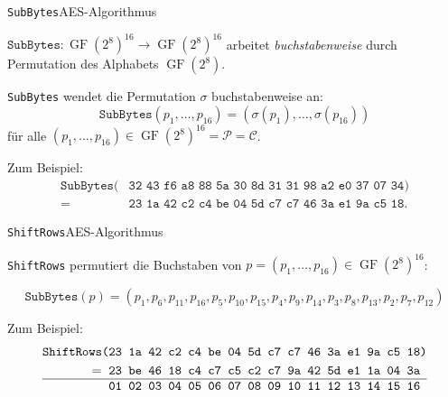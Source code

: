 \documentclass{beamer}
\newcommand{\mc}{\mathcal}
\newcommand{\GF}{\operatorname{GF}}
\theoremstyle{plain}
\begin{document}
\begin{frame}{\texttt{SubBytes}}{AES-Algorithmus}
\begin{block}{}$\texttt{SubBytes}: \GF(2^8)^{16} \rightarrow \GF(2^8)^{16}$ arbeitet \emph{buchstabenweise} durch Permutation des Alphabets $\GF(2^8)$.\end{block}\medskip

\texttt{SubBytes} wendet die Permutation $\sigma$ buchstabenweise an:
\[\texttt{SubBytes}(p_1, \dots, p_{16}) = (\sigma(p_1), \dotsc, \sigma(p_{16}))\]
für alle $(p_1, \dots, p_{16}) \in \GF(2^8)^{16} = \mc P = \mc C$.
\bigskip

Zum Beispiel:
\begin{align*}
\texttt{SubBytes(}&\texttt{32 43 f6 a8 88 5a 30 8d 31 31 98 a2 e0 37 07 34)} \\
 =\;\;& \texttt{23 1a 42 c2 c4 be 04 5d c7 c7 46 3a e1 9a c5 18}.
 \end{align*}
 \end{frame}
 
 \begin{frame}{\texttt{ShiftRows}}{AES-Algorithmus}
 \begin{block}{}

 \texttt{ShiftRows} permutiert die Buchstaben von $p = (p_1, \dots, p_{16}) \in \GF(2^8)^{16}$:
   \begin{small}
\[\texttt{SubBytes}(p) = (p_1, p_6, p_{11}, p_{16}, p_5, p_{10}, p_{15}, p_4, p_9, p_{14}, p_3, p_8, p_{13}, p_2, p_7, p_{12})\]
\end{small}
\end{block}
\medskip

Zum Beispiel:
\begin{align*}
\texttt{ShiftRows(}&\texttt{23 1a 42 c2 c4 be 04 5d c7 c7 46 3a e1 9a c5 18)}\\
 =\;\;& \texttt{23 be 46 18 c4 c7 c5 c2 c7 9a 42 5d e1 1a 04 3a}\\
 \hline
 	           &\texttt{01 02 03 04 05 06 07 08 09 10 11 12 13 14 15 16} 
\end{align*}

 \end{frame}
\end{document}
